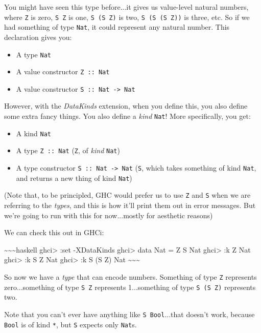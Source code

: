 \documentclass[]{article}
\begin{document}
You might have seen this type before...it gives us value-level natural numbers,
where \texttt{Z} is zero, \texttt{S\ Z} is one, \texttt{S\ (S\ Z)} is two,
\texttt{S\ (S\ (S\ Z))} is three, etc. So if we had something of type
\texttt{Nat}, it could represent any natural number. This declaration gives you:

\begin{itemize}
\tightlist
\item
  A type \texttt{Nat}
\item
  A value constructor \texttt{Z\ ::\ Nat}
\item
  A value constructor \texttt{S\ ::\ Nat\ -\textgreater{}\ Nat}
\end{itemize}

However, with the \emph{DataKinds} extension, when you define this, you also
define some extra fancy things. You also define a \emph{kind} \texttt{Nat}! More
specifically, you get:

\begin{itemize}
\tightlist
\item
  A kind \texttt{Nat}
\item
  A type \texttt{Z\ ::\ Nat} (\texttt{Z}, of \emph{kind} \texttt{Nat})
\item
  A type constructor \texttt{S\ ::\ Nat\ -\textgreater{}\ Nat} (\texttt{S},
  which takes something of kind \texttt{Nat}, and returns a new thing of kind
  \texttt{Nat})
\end{itemize}

(Note that, to be principled, GHC would prefer us to use
\texttt{\textquotesingle{}Z} and \texttt{\textquotesingle{}S} when we are
referring to the \emph{types}, and this is how it'll print them out in error
messages. But we're going to run with this for now...mostly for aesthetic
reasons)

We can check this out in GHCi:

\textasciitilde{}\textasciitilde{}\textasciitilde{}haskell ghci\textgreater{}
:set -XDataKinds ghci\textgreater{} data Nat = Z \textbar{} S Nat
ghci\textgreater{} :k Z Nat ghci\textgreater{} :k S Z Nat ghci\textgreater{} :k
S (S Z) Nat \textasciitilde{}\textasciitilde{}\textasciitilde{}

So now we have a \emph{type} that can encode numbers. Something of type
\texttt{Z} represents zero...something of type \texttt{S\ Z} represents
1...something of type \texttt{S\ (S\ Z)} represents two.

Note that you can't ever have anything like \texttt{S\ Bool}...that doesn't
work, because \texttt{Bool} is of kind \texttt{*}, but \texttt{S} expects only
\texttt{Nat}s.
\end{document}
